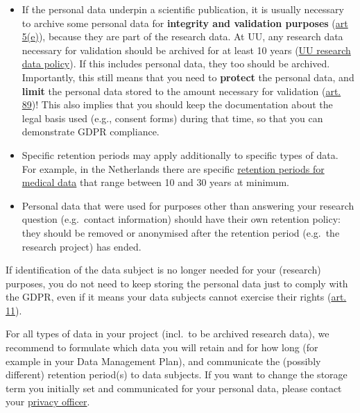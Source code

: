 \documentclass[
]{book}
\providecommand{\tightlist}{%
  \setlength{\itemsep}{0pt}\setlength{\parskip}{0pt}}
\begin{document}
\begin{itemize}
\tightlist
\item
  If the personal data underpin a scientific publication, it is usually necessary
  to archive some personal data for \textbf{integrity and validation purposes}
  (\href{https://gdpr-info.eu/art-5-gdpr/}{art 5(e)}),
  because they are part of the research data. At UU, any research data necessary
  for validation should be archived for at least 10 years
  (\href{https://www.uu.nl/sites/default/files/university_policy_framework_for_research_data_utrecht_university_-_january_2016.pdf}{UU research data policy}).
  If this includes personal data, they too should be archived. Importantly, this
  still means that you need to \textbf{protect} the personal data, and \textbf{limit} the personal
  data stored to the amount necessary for validation
  (\href{https://gdpr-info.eu/art-89-gdpr/}{art. 89})!
  This also implies that you should keep the documentation about the legal basis
  used (e.g., consent forms) during that time, so that you can demonstrate GDPR
  compliance.
\item
  Specific retention periods may apply additionally to specific types of data.
  For example, in the Netherlands there are specific
  \href{https://english.ccmo.nl/investigators/data-retention-periods-for-medical-research}{retention periods for medical data}
  that range between 10 and 30 years at minimum.
\item
  Personal data that were used for purposes other than answering your
  research question (e.g.~contact information) should have their own retention
  policy: they should be removed or anonymised after the retention period
  (e.g.~the research project) has ended.
\end{itemize}

If identification of the data subject is no longer needed for your
(research) purposes, you do not need to keep storing the personal data just
to comply with the GDPR, even if it means your data subjects cannot exercise
their rights (\href{https://gdpr-info.eu/art-11-gdpr/}{art. 11}).

For all types of data in your project (incl.~to be archived research data), we
recommend to formulate which data you will retain and for how long (for example
in your Data Management Plan), and communicate the (possibly different)
retention period(s) to data subjects. If you want to change the storage term you
initially set and communicated for your personal data, please contact your
\protect\hyperlink{support}{privacy officer}.
\end{document}
